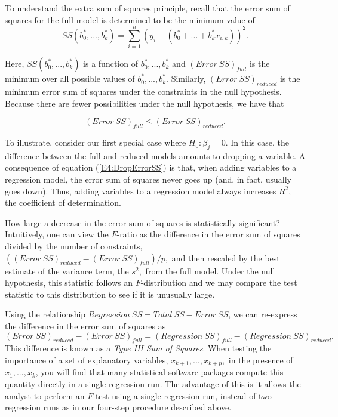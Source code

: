 \bigskip

To understand the extra sum of squares principle, recall that the
error sum of squares for the full model is determined to be the
minimum value of
\begin{equation*}
SS(b_{0}^{\ast },...,b_k^{\ast })=\sum_{i=1}^{n}\left( y_{i}-\left(
b_{0}^{\ast }+...+b_k^{\ast }x_{i,k}\right) \right) ^{2}.
\end{equation*}

\noindent Here, $SS(b_{0}^{\ast },...,b_{k}^{\ast })$ is a function
of $b_{0}^{\ast },...,b_{k}^{\ast }$ and $(Error~SS)_{full}$ is the
minimum over all
possible values of $b_{0}^{\ast },...,b_{k}^{\ast }$. Similarly, $%
(Error~SS)_{reduced}$ is the minimum error sum of squares under the
constraints in the null hypothesis. Because there are fewer
possibilities under the null hypothesis, we have that

\begin{equation}\label{E4:DropErrorSS}
(Error~SS)_{full}\leq (Error~SS)_{reduced}.
\end{equation}

To illustrate, consider our first special case where $H_0 : \beta_j
= 0$. In this case, the difference between the full and reduced
models amounts to dropping a variable. A consequence of equation
(\ref{E4:DropErrorSS}) is that, when adding variables to a
regression model, the error sum of squares never goes up (and, in
fact, usually goes down). Thus, adding variables to a regression
model always increases $R^2,$ the coefficient of determination.

How large a decrease in the error sum of squares is statistically
significant? Intuitively, one can view the $F$-ratio as the
difference in the error sum of squares divided by the number of
constraints, $((Error~SS)_{reduced}-(Error~SS)_{full})/p,$ and then
rescaled by the best estimate of the variance term, the $s^{2},$
from the full model. Under the null hypothesis, this statistic
follows an $F$-distribution and we may compare the test statistic to
this distribution to see if it is unusually large.

Using the relationship $Regression~SS=Total~SS-Error~SS$, we can
re-express the difference in the error sum of squares as
\begin{equation*}
(Error~SS)_{reduced}-(Error~SS)_{full}=(Regression~SS)_{full}-(Regression~SS)_{reduced}.
\end{equation*} 
This difference is known as a \emph{Type III Sum of Squares}. When
testing the importance of a set of explanatory variables,
$x_{k+1},...,x_{k+p},$ in the presence of $x_{1},...,x_{k}$, you
will find that many statistical software packages compute this
quantity directly in a single regression run. The advantage of this
is it allows the analyst to perform an $F$-test using a single
regression run, instead of two regression runs as in our four-step
procedure described above.


